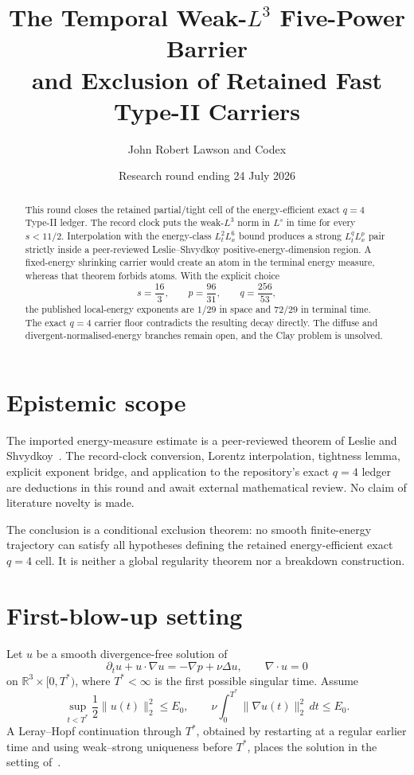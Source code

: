 \documentclass[11pt]{article}
\title{The Temporal Weak-\(L^3\) Five-Power Barrier\\
and Exclusion of Retained Fast Type-II Carriers}
\author{John Robert Lawson and Codex}
\date{Research round ending 24 July 2026}
\theoremstyle{remark}
\newcommand{\R}{\mathbb R}
\begin{document}
\maketitle

\begin{abstract}
This round closes the retained partial/tight cell of the
energy-efficient exact \(q=4\) Type-II ledger.  The record clock puts the
weak-\(L^3\) norm in \(L^s\) in time for every \(s<11/2\).  Interpolation
with the energy-class \(L^2_tL^6_x\) bound produces a strong
\(L^q_tL^p_x\) pair strictly inside a peer-reviewed
Leslie--Shvydkoy positive-energy-dimension region.  A fixed-energy
shrinking carrier would create an atom in the terminal energy measure,
whereas that theorem forbids atoms.  With the explicit choice
\[
 s=\frac{16}{3},\qquad
 p=\frac{96}{31},\qquad
 q=\frac{256}{53},
\]
the published local-energy exponents are \(1/29\) in space and \(72/29\)
in terminal time.  The exact \(q=4\) carrier floor contradicts the
resulting decay directly.  The diffuse and
divergent-normalised-energy branches remain open, and the Clay problem is
unsolved.
\end{abstract}

\section{Epistemic scope}

The imported energy-measure estimate is a peer-reviewed theorem of
Leslie and Shvydkoy~\cite{LS18}.  The record-clock conversion, Lorentz
interpolation, tightness lemma, explicit exponent bridge, and application
to the repository's exact \(q=4\) ledger are deductions in this round and
await external mathematical review.  No claim of literature novelty is
made.

The conclusion is a conditional exclusion theorem: no smooth
finite-energy trajectory can satisfy all hypotheses defining the retained
energy-efficient exact \(q=4\) cell.  It is neither a global regularity
theorem nor a breakdown construction.

\section{First-blow-up setting}

Let \(u\) be a smooth divergence-free solution of
\[
 \partial_tu+u\cdot\nabla u=-\nabla p+\nu\Delta u,
 \qquad
 \nabla\cdot u=0
\]
on \(\R^3\times[0,T^*)\), where \(T^*<\infty\) is the first possible
singular time.  Assume
\[
 \sup_{t<T^*}\frac12\|u(t)\|_2^2\le E_0,
 \qquad
 \nu\int_0^{T^*}\|\nabla u(t)\|_2^2\,dt\le E_0.
\]
A Leray--Hopf continuation through \(T^*\), obtained by restarting at a
regular earlier time and using weak--strong uniqueness before \(T^*\),
places the solution in the setting of~\cite{LS18}.
\end{document}
